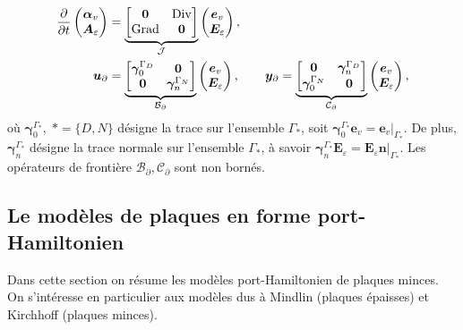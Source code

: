 \begin{equation*}
\begin{aligned}
\displaystyle
\diffp{}{t}
\begin{pmatrix}
\bm{\alpha}_v \\
\bm{A}_\varepsilon
\end{pmatrix} &= \underbrace{
	\begin{bmatrix}
	\bm{0} & \Div \\
	\Grad & \bm{0} \\
	\end{bmatrix}}_{\mathcal{J}}
\begin{pmatrix}
\bm{e}_v \\
\bm{E}_\varepsilon
\end{pmatrix}, \vspace{3pt}\\
\bm{u}_\partial &= \underbrace{
	\begin{bmatrix}
	\bm\gamma_{0}^{\Gamma_D} & \bm{0} \\
	\bm{0} & \bm\gamma_n^{\Gamma_N} \\
	\end{bmatrix}}_{\mathcal{B}_\partial} \begin{pmatrix}
\bm{e}_v \\
\bm{E}_\varepsilon
\end{pmatrix}, \qquad
\bm{y}_\partial = \underbrace{
	\begin{bmatrix}
	\bm{0} & \bm\gamma_{n}^{\Gamma_D} \\
	\bm\gamma_0^{\Gamma_N} & \bm{0} \\
	\end{bmatrix}}_{\mathcal{C}_\partial}
\begin{pmatrix}
\bm{e}_v \\
\bm{E}_\varepsilon
\end{pmatrix},
\end{aligned}
\end{equation*}
où $\bm\gamma_{0}^{\Gamma_*}, \; *=\{D, N\}$ désigne la trace sur l'ensemble $\Gamma_* $, soit $ \bm\gamma_{0}^{\Gamma_*} \bm{e}_v = \bm{e}_v \vert_{\Gamma_*} $. De plus, $ \bm\gamma_{n}^{\Gamma_*} $ désigne la trace normale sur l'ensemble $\Gamma_*$, à savoir $\bm\gamma_{n}^{\Gamma_*} \bm{E}_\varepsilon = \bm{E}_\varepsilon \bm{n} \vert_{\Gamma_*}$. Les opérateurs de frontière $\mathcal{B}_\partial, \mathcal{C}_\partial $ sont non bornés.

\subsection*{Le modèles de plaques en forme port-Hamiltonien}
Dans cette section on résume les modèles port-Hamiltonien de plaques minces. On s'intéresse en particulier aux modèles dus à Mindlin \cite{mindlin1951} (plaques épaisses) et Kirchhoff (plaques minces). 

